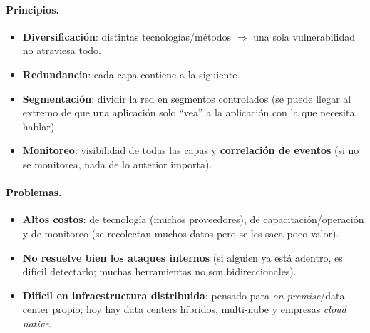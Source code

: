 \documentclass[../main.tex]{subfiles}
\begin{document}
\begin{center}
\end{center}

\paragraph{Principios.}
\begin{itemize}
  \item \textbf{Diversificación}: distintas tecnologías/métodos $\Rightarrow$ una
    sola vulnerabilidad no atraviesa todo.
  \item \textbf{Redundancia}: cada capa contiene a la siguiente.
  \item \textbf{Segmentación}: dividir la red en segmentos controlados (se puede
    llegar al extremo de que una aplicación solo ``vea'' a la aplicación con la
    que necesita hablar).
  \item \textbf{Monitoreo}: visibilidad de todas las capas y
    \textbf{correlación de eventos} (si no se monitorea, nada de lo anterior
    importa).
\end{itemize}

\paragraph{Problemas.}
\begin{itemize}
  \item \textbf{Altos costos}: de tecnología (muchos proveedores), de
    capacitación/operación y de monitoreo (se recolectan muchos datos pero se
    les saca poco valor).
  \item \textbf{No resuelve bien los ataques internos} (si alguien ya está
    adentro, es difícil detectarlo; muchas herramientas no son bidireccionales).
  \item \textbf{Difícil en infraestructura distribuida}: pensado para
    \emph{on-premise}/data center propio; hoy hay data centers híbridos,
    multi-nube y empresas \emph{cloud native}.
\end{itemize}
\end{document}
